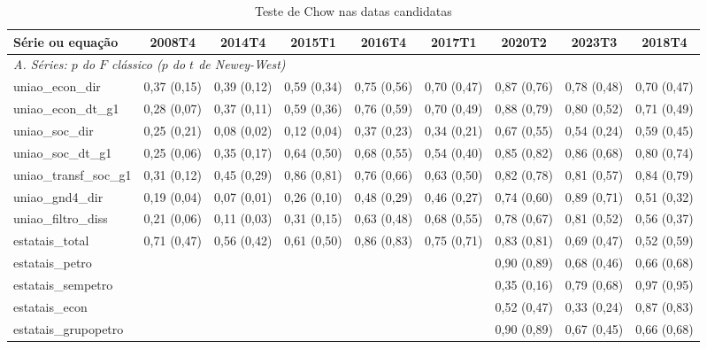 \begin{table}[htbp]
\centering
\caption{Teste de Chow nas datas candidatas}
\label{tab:a4_chow}
\tiny
\begin{tabular}{lcccccccc}
\toprule
S\'erie ou equa\c{c}\~ao & 2008T4 & 2014T4 & 2015T1 & 2016T4 & 2017T1 & 2020T2 & 2023T3 & 2018T4 \\
\midrule
\multicolumn{9}{l}{\textit{A. S\'eries: $p$ do $F$ cl\'assico ($p$ do $t$ de Newey-West)}} \\
uniao\_econ\_dir & 0{,}37 (0{,}15) & 0{,}39 (0{,}12) & 0{,}59 (0{,}34) & 0{,}75 (0{,}56) & 0{,}70 (0{,}47) & 0{,}87 (0{,}76) & 0{,}78 (0{,}48) & 0{,}70 (0{,}47) \\
uniao\_econ\_dt\_g1 & 0{,}28 (0{,}07) & 0{,}37 (0{,}11) & 0{,}59 (0{,}36) & 0{,}76 (0{,}59) & 0{,}70 (0{,}49) & 0{,}88 (0{,}79) & 0{,}80 (0{,}52) & 0{,}71 (0{,}49) \\
uniao\_soc\_dir & 0{,}25 (0{,}21) & 0{,}08 (0{,}02) & 0{,}12 (0{,}04) & 0{,}37 (0{,}23) & 0{,}34 (0{,}21) & 0{,}67 (0{,}55) & 0{,}54 (0{,}24) & 0{,}59 (0{,}45) \\
uniao\_soc\_dt\_g1 & 0{,}25 (0{,}06) & 0{,}35 (0{,}17) & 0{,}64 (0{,}50) & 0{,}68 (0{,}55) & 0{,}54 (0{,}40) & 0{,}85 (0{,}82) & 0{,}86 (0{,}68) & 0{,}80 (0{,}74) \\
uniao\_transf\_soc\_g1 & 0{,}31 (0{,}12) & 0{,}45 (0{,}29) & 0{,}86 (0{,}81) & 0{,}76 (0{,}66) & 0{,}63 (0{,}50) & 0{,}82 (0{,}78) & 0{,}81 (0{,}57) & 0{,}84 (0{,}79) \\
uniao\_gnd4\_dir & 0{,}19 (0{,}04) & 0{,}07 (0{,}01) & 0{,}26 (0{,}10) & 0{,}48 (0{,}29) & 0{,}46 (0{,}27) & 0{,}74 (0{,}60) & 0{,}89 (0{,}71) & 0{,}51 (0{,}32) \\
uniao\_filtro\_diss & 0{,}21 (0{,}06) & 0{,}11 (0{,}03) & 0{,}31 (0{,}15) & 0{,}63 (0{,}48) & 0{,}68 (0{,}55) & 0{,}78 (0{,}67) & 0{,}81 (0{,}52) & 0{,}56 (0{,}37) \\
estatais\_total & 0{,}71 (0{,}47) & 0{,}56 (0{,}42) & 0{,}61 (0{,}50) & 0{,}86 (0{,}83) & 0{,}75 (0{,}71) & 0{,}83 (0{,}81) & 0{,}69 (0{,}47) & 0{,}52 (0{,}59) \\
estatais\_petro &  &  &  &  &  & 0{,}90 (0{,}89) & 0{,}68 (0{,}46) & 0{,}66 (0{,}68) \\
estatais\_sempetro &  &  &  &  &  & 0{,}35 (0{,}16) & 0{,}79 (0{,}68) & 0{,}97 (0{,}95) \\
estatais\_econ &  &  &  &  &  & 0{,}52 (0{,}47) & 0{,}33 (0{,}24) & 0{,}87 (0{,}83) \\
estatais\_grupopetro &  &  &  &  &  & 0{,}90 (0{,}89) & 0{,}67 (0{,}45) & 0{,}66 (0{,}68) \\

\end{tabular}
\end{table}
